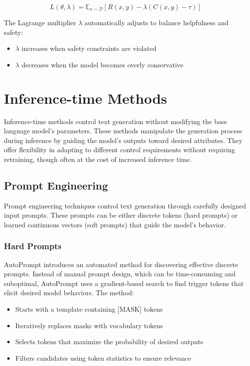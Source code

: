 \begin{equation}
    L(\theta, \lambda) = \mathbb{E}_{x\sim\mathcal{D}}[R(x,y) - \lambda(C(x,y) - \tau)]
\end{equation}

The Lagrange multiplier $\lambda$ automatically adjusts to balance helpfulness and safety:
\begin{itemize}
    \item $\lambda$ increases when safety constraints are violated
    \item $\lambda$ decreases when the model becomes overly conservative
\end{itemize}

\section{Inference-time Methods}
\label{c2:s:inference}

Inference-time methods control text generation without modifying the base language model's parameters. These methods manipulate the generation process during inference by guiding the model's outputs toward desired attributes. They offer flexibility in adapting to different control requirements without requiring retraining, though often at the cost of increased inference time.

\subsection{Prompt Engineering}

Prompt engineering techniques control text generation through carefully designed input prompts. These prompts can be either discrete tokens (hard prompts) or learned continuous vectors (soft prompts) that guide the model's behavior.

\subsubsection{Hard Prompts}

AutoPrompt introduces an automated method for discovering effective discrete prompts. Instead of manual prompt design, which can be time-consuming and suboptimal, AutoPrompt uses a gradient-based search to find trigger tokens that elicit desired model behaviors. The method:

\begin{itemize}
    \item Starts with a template containing [MASK] tokens
    \item Iteratively replaces masks with vocabulary tokens
    \item Selects tokens that maximize the probability of desired outputs
    \item Filters candidates using token statistics to ensure relevance
\end{itemize}

